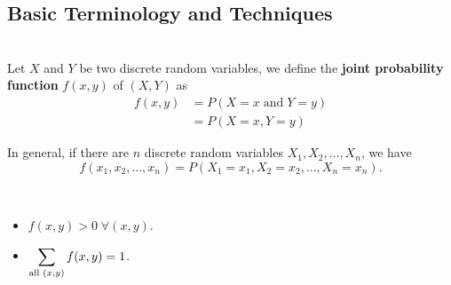 \subsection{Basic Terminology and Techniques}




\begin{definition}
    \phantom{}\\
    Let $X$ and $Y$ be two discrete random variables, we define the \textbf{joint probability function}
    $f(x, y)$ of $(X, Y)$ as \vspace{-3mm}
    \begin{align*}
        f(x, y) &= P(X = x \; \text{and} \; Y = y)    \\
                &= P(X = x, Y = y)
    \end{align*}
\end{definition}

\begin{remark}
    In general, if there are $n$ discrete random variables $X_1, X_2, \ldots, X_n$, we have \vspace{-2mm}
    \[f(x_1, x_2, \ldots, x_n) = P(X_1 = x_1, X_2 = x_2, \ldots, X_n = x_n).\]
\end{remark}


\begin{theorem}
    \phantom{}\
    \begin{itemize}
        \item $f(x, y) > 0 \; \forall (x, y)$.
        \item $\displaystyle \sum_{\text{all } (x, y)} f(x, y) = 1$.
    \end{itemize}
\end{theorem}


